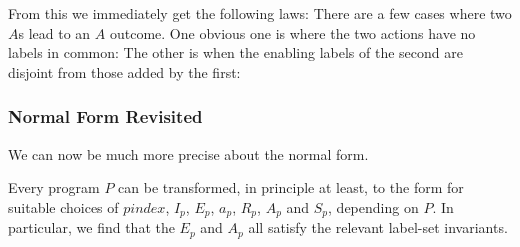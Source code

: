 From this we immediately get the following laws:
There are a few cases where two $A$s lead to an $A$ outcome.
One obvious one is where the two actions have no labels in common:
The other is when the enabling labels of the second
are disjoint from those added by the first:


\newpage
\subsubsection{Normal Form Revisited}

We can now be much more precise about the normal form.

Every program $P$ can be transformed,
in principle at least,
to the form
for suitable choices of $pindex$, $I_p$, $E_p$, $a_p$, $R_p$, $A_p$ and $S_p$,
depending on $P$.
In particular, we find that the $E_p$ and $A_p$ all satisfy the relevant
label-set invariants.



